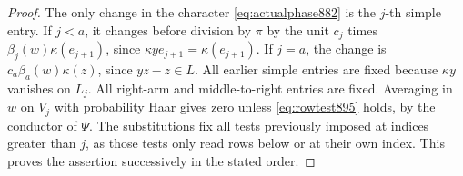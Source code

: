\documentclass[a4paper,11pt]{article}
\theoremstyle{definition}
\theoremstyle{remark}
\numberwithin{equation}{section}
\begin{document}
\begin{proof}
The only change in the character \eqref{eq:actualphase882} is
the \(j\)-th simple entry. If \(j<a\), it changes before division
by \(\pi\) by the unit \(c_j\) times
\(\beta_j(w)\kappa(e_{j+1})\), since
\(\kappa y e_{j+1}=\kappa(e_{j+1})\).
If \(j=a\), the change is \(c_a\beta_a(w)\kappa(z)\), since
\(yz-z\in L\). All earlier simple entries are fixed because
\(\kappa y\) vanishes on \(L_j\). All right-arm and middle-to-right
entries are fixed. Averaging in \(w\) on \(V_j\) with probability
Haar gives zero unless \eqref{eq:rowtest895} holds, by the
conductor of \(\Psi\). The substitutions fix all tests previously
imposed at indices greater than \(j\), as those tests only read
rows below or at their own index. This proves the assertion
successively in the stated order.
\end{proof}
\end{document}
